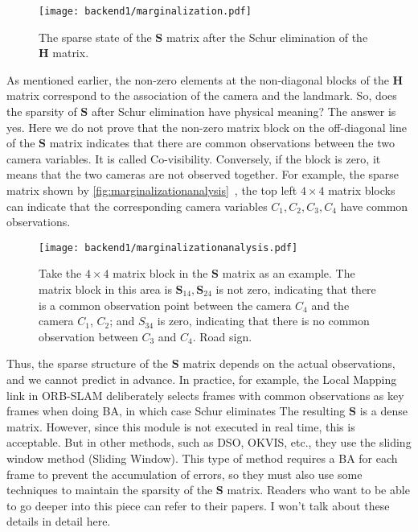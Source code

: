 \begin{figure}[!ht]
\centering
\texttt{[image: backend1/marginalization.pdf]}
\caption{The sparse state of the $\bm{S}$ matrix after the Schur elimination of the $\bm{H}$ matrix. }
\label{fig:marginalization}
\end{figure}

As mentioned earlier, the non-zero elements at the non-diagonal blocks of the $\bm{H}$ matrix correspond to the association of the camera and the landmark. So, does the sparsity of $\bm{S}$ after Schur elimination have physical meaning? The answer is yes. Here we do not prove that the non-zero matrix block on the off-diagonal line of the $\bm{S}$ matrix indicates that there are common observations between the two camera variables. It is called Co-visibility. Conversely, if the block is zero, it means that the two cameras are not observed together. For example, the sparse matrix shown by \autoref{fig:marginalizationanalysis}~, the top left $4 \times 4$ matrix blocks can indicate that the corresponding camera variables $C_1, C_2, C_3, C_4$ have common observations.

\begin{figure}[!htp]
\centering
\texttt{[image: backend1/marginalizationanalysis.pdf]}
\caption{ Take the $4 \times 4$ matrix block in the $\bm{S}$ matrix as an example. The matrix block in this area is $\bm{S}_{14}, \bm{S}_{24 }$ is not zero, indicating that there is a common observation point between the camera $C_4$ and the camera $C_1$, $C_2$; and $S_{34}$ is zero, indicating that there is no common observation between $C_3$ and $C_4$. Road sign. }
\label{fig:marginalizationanalysis}
\end{figure}
\clearpage
Thus, the sparse structure of the $\bm{S}$ matrix depends on the actual observations, and we cannot predict in advance. In practice, for example, the Local Mapping link in ORB-SLAM\textsuperscript{\cite{Mur-Artal2015}} deliberately selects frames with common observations as key frames when doing BA, in which case Schur eliminates The resulting $\bm{S}$ is a dense matrix. However, since this module is not executed in real time, this is acceptable. But in other methods, such as DSO\textsuperscript{\cite{Engel2016}}, OKVIS\textsuperscript{\cite{Leutenegger2015}}, etc., they use the sliding window method (Sliding Window). This type of method requires a BA for each frame to prevent the accumulation of errors, so they must also use some techniques to maintain the sparsity of the $\bm{S}$ matrix. Readers who want to be able to go deeper into this piece can refer to their papers. I won't talk about these details in detail here.

